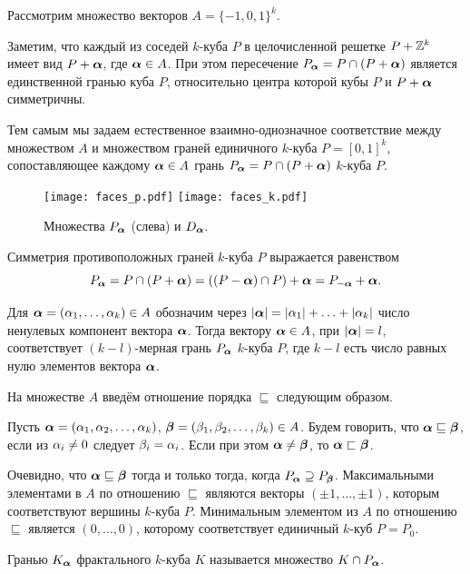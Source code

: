 Рассмотрим множество векторов $A=\{-1,0,1\}^k$.

Заметим, что каждый из соседей $k$-куба $P$ в целочисленной решетке $P+\mathbb{Z}^k$ имеет вид $P+{\bm{\alpha}}$, где ${\bm{\alpha}}\in A$. При этом пересечение $P_{\bm{\alpha}}=P\cap(P+{\bm{\alpha}})$ является единственной гранью куба $P$, относительно центра которой кубы $P$ и $P+{\bm{\alpha}}$ симметричны. 

Тем самым мы задаем  естественное  взаимно-однозначное соответствие
между множеством $A$ и множеством граней единичного $k$-куба $P=[0,1]^k$, сопоставляющее каждому ${\bm{\alpha}}\in A$ грань 
$P_{\bm{\alpha}}=P\cap(P+{\bm{\alpha}})$ $k$-куба $P$.

\begin{figure}[h!]
 \centering
 \texttt{[image: faces\_p.pdf]}
 \hfill
 \texttt{[image: faces\_k.pdf]}
 \caption{Множества $P_{\bm{\alpha}}$ (слева) и $D_{\bm{\alpha}}.$}
 \label{fig:faces}
\end{figure}


Симметрия противоположных граней $k$-куба $P$ выражается равенством 
$$P_{\bm{\alpha}}=P\cap(P+{\bm{\alpha}})=((P-{\bm{\alpha}})\cap P)+{\bm{\alpha}}=P_{-{\bm{\alpha}}}+{\bm{\alpha}}.$$

Для ${\bm{\alpha}}=(\alpha_1,\ldots,\alpha_k)\in A$  обозначим через $|{\bm{\alpha}}|=|\alpha_1|+\ldots+|\alpha_k|$ число ненулевых компонент вектора ${\bm{\alpha}}$.
Тогда вектору ${\bm{\alpha}}\in A$, при $|{\bm{\alpha}}|=l$, соответствует $(k-l)$-мерная грань $P_{\bm{\alpha}}$ $k$-куба $P$, где $k-l$ есть число равных нулю элементов вектора ${\bm{\alpha}}$.


На множестве $A$ введём отношение порядка $\sqsubseteq$ следующим образом.

\begin{definition}\label{Aorder}
Пусть ${\bm{\alpha}}=(\alpha_1,\alpha_2,\ldots,\alpha_k)$, ${\bm{\beta}}=(\beta_1,\beta_2,\ldots,\beta_k)\in A$.
Будем говорить, что ${\bm{\alpha}}\sqsubseteq{\bm{\beta}}$, если из $\alpha_i\neq 0$ следует $\beta_i=\alpha_i$.
Если при этом ${\bm{\alpha}}\neq{\bm{\beta}}$, то ${\bm{\alpha}}\sqsubset{\bm{\beta}}$.
\end{definition}

Очевидно, что ${\bm{\alpha}}\sqsubseteq{\bm{\beta}}$ тогда и только тогда, когда $P_{\bm{\alpha}}\supseteq P_{\bm{\beta}}$. 
Максимальными элементами в $A$ по отношению $\sqsubseteq$ являются векторы $(\pm 1,\ldots,\pm 1)$, которым соответствуют вершины $k$-куба $P$.
Минимальным элементом из $A$ по отношению $\sqsubseteq$ является $(0, \ldots, 0)$, которому соответствует единичный $k$-куб $P=P_{0}$.

\begin{definition}\label{def:K_alpha}
Гранью $K_{\bm{\alpha}}$ фрактального $k$-куба $K$ называется множество $K\cap P_{\bm{\alpha}}$.
\end{definition}

